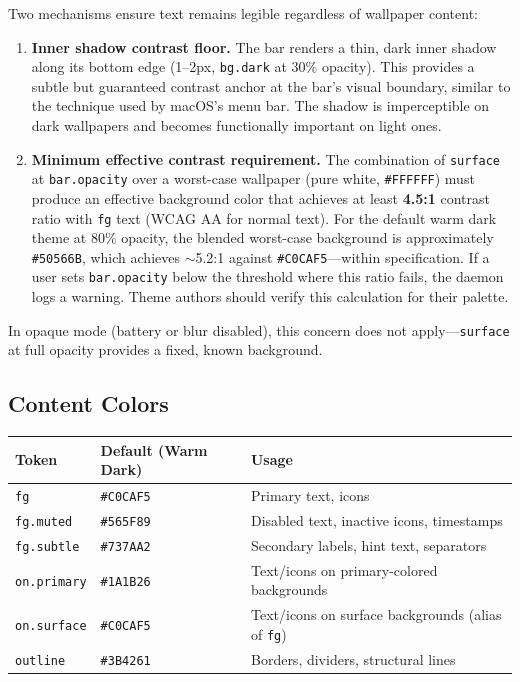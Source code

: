 \documentclass[11pt,a4paper]{article}
\begin{document}
Two mechanisms ensure text remains legible regardless of wallpaper content:

\begin{enumerate}[leftmargin=1.5em, itemsep=3pt]
  \item \textbf{Inner shadow contrast floor.} The bar renders a thin, dark inner shadow along its bottom edge (1--2px, \texttt{bg.dark} at 30\% opacity). This provides a subtle but guaranteed contrast anchor at the bar's visual boundary, similar to the technique used by macOS's menu bar. The shadow is imperceptible on dark wallpapers and becomes functionally important on light ones.

  \item \textbf{Minimum effective contrast requirement.} The combination of \texttt{surface} at \texttt{bar.opacity} over a worst-case wallpaper (pure white, \texttt{\#FFFFFF}) must produce an effective background color that achieves at least \textbf{4.5:1} contrast ratio with \texttt{fg} text (WCAG AA for normal text). For the default warm dark theme at 80\% opacity, the blended worst-case background is approximately \texttt{\#50566B}, which achieves $\sim$5.2:1 against \texttt{\#C0CAF5}---within specification. If a user sets \texttt{bar.opacity} below the threshold where this ratio fails, the daemon logs a warning. Theme authors should verify this calculation for their palette.
\end{enumerate}

In opaque mode (battery or blur disabled), this concern does not apply---\texttt{surface} at full opacity provides a fixed, known background.

\subsection{Content Colors}

\begin{longtable}{p{3.5cm} p{3cm} p{7cm}}
\toprule
\textbf{Token} & \textbf{Default (Warm Dark)} & \textbf{Usage} \\
\midrule
\texttt{fg} & \texttt{\#C0CAF5} & Primary text, icons \\
\texttt{fg.muted} & \texttt{\#565F89} & Disabled text, inactive icons, timestamps \\
\texttt{fg.subtle} & \texttt{\#737AA2} & Secondary labels, hint text, separators \\
\texttt{on.primary} & \texttt{\#1A1B26} & Text/icons on primary-colored backgrounds \\
\texttt{on.surface} & \texttt{\#C0CAF5} & Text/icons on surface backgrounds (alias of \texttt{fg}) \\
\texttt{outline} & \texttt{\#3B4261} & Borders, dividers, structural lines \\
\bottomrule
\end{longtable}
\end{document}
